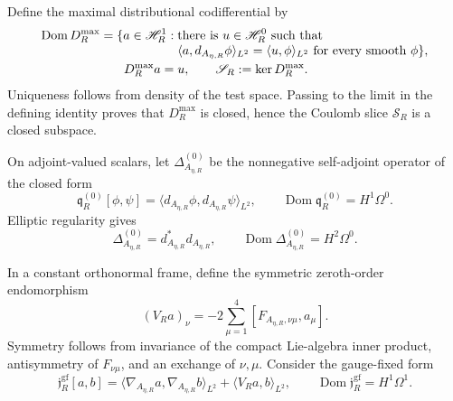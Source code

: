 Define the maximal distributional codifferential by
\begin{align}
 \operatorname{Dom}D_R^{\max}
 =\{a\in\mathscr H_R^1:\;&\text{there is }u\in\mathscr H_R^0\text{ such that}
 \notag\\[-1mm]
 &\langle a,d_{A_{\eta,R}}\phi\rangle_{L^2}
 =\langle u,\phi\rangle_{L^2}
 \text{ for every smooth }\phi\},
 \label{cusp-native-full-flux-max-codiff-domain}\\
 D_R^{\max}a={}&u,
 \qquad \mathscr S_R:=\ker D_R^{\max}.
 \label{cusp-native-full-flux-Coulomb-slice}
\end{align}
Uniqueness follows from density of the test space.  Passing to the limit in
the defining identity proves that \(D_R^{\max}\) is closed, hence the Coulomb
slice \(\mathscr S_R\) is a closed subspace.

On adjoint-valued scalars, let \(\Delta_{A_{\eta,R}}^{(0)}\) be the
nonnegative self-adjoint operator of the closed form
\begin{equation}
 \mathfrak q_R^{(0)}[\phi,\psi]
 =\langle d_{A_{\eta,R}}\phi,d_{A_{\eta,R}}\psi\rangle_{L^2},
 \qquad
 \operatorname{Dom}\mathfrak q_R^{(0)}=H^1\Omega^0.
 \label{cusp-native-full-flux-scalar-form}
\end{equation}
Elliptic regularity gives
\begin{equation}
 \Delta_{A_{\eta,R}}^{(0)}=d_{A_{\eta,R}}^*d_{A_{\eta,R}},
 \qquad
 \operatorname{Dom}\Delta_{A_{\eta,R}}^{(0)}=H^2\Omega^0.
 \label{cusp-native-full-flux-scalar-domain}
\end{equation}

In a constant orthonormal frame, define the symmetric zeroth-order
endomorphism
\begin{equation}
 (V_Ra)_\nu=-2\sum_{\mu=1}^4
 [F_{A_{\eta,R},\nu\mu},a_\mu].
 \label{cusp-native-full-flux-spin-endomorphism}
\end{equation}
Symmetry follows from invariance of the compact Lie-algebra inner product,
antisymmetry of \(F_{\nu\mu}\), and an exchange of \(\nu,\mu\).  Consider
the gauge-fixed form
\begin{equation}
 \mathfrak j_R^{\mathrm{gf}}[a,b]
 =\langle\nabla_{A_{\eta,R}}a,\nabla_{A_{\eta,R}}b\rangle_{L^2}
  +\langle V_Ra,b\rangle_{L^2},
 \qquad
 \operatorname{Dom}\mathfrak j_R^{\mathrm{gf}}=H^1\Omega^1.
 \label{cusp-native-full-flux-Jacobi-form}
\end{equation}

